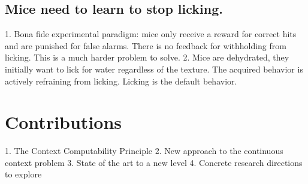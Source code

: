 \documentclass[]{article}
\begin{document}
\subsection{Mice need to learn to stop licking.}
1. Bona fide experimental paradigm: mice only receive a reward for correct hits and are punished for false alarms.  There is no feedback for withholding from licking.  This is a much harder problem to solve.
2. Mice are dehydrated, they initially want to lick for water regardless of the texture.  The acquired behavior is actively refraining from licking.  Licking is the default behavior.

\section{Contributions}
1. The Context Computability Principle
2. New approach to the continuous context problem
3. State of the art to a new level
4. Concrete research directions to explore


\newpage
\end{document}

